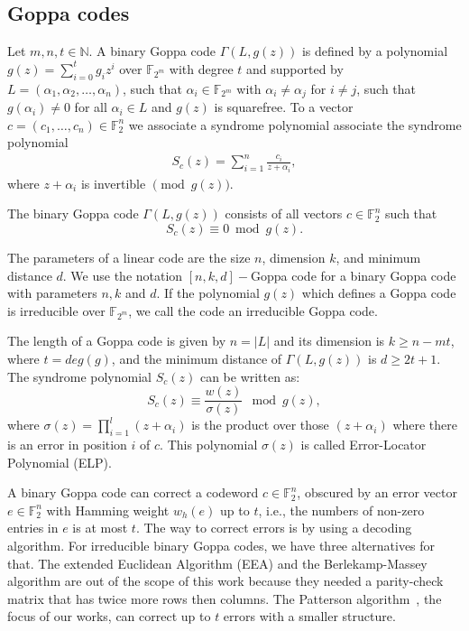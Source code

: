 \subsection{Goppa codes}
Let $m, n, t\in \mathbb{N}$. A binary Goppa code $\Gamma(L, g(z))$ is defined by a polynomial $g(z) = \sum_{i=0}^{t}g_iz^i$ over $\mathbb{F}_{2^m}$ with degree $t$ and supported by $L = (\alpha_1, \alpha_2, \dots, \alpha_n)$, such that $\alpha_i \in \mathbb{F}_{2^m}$ with $\alpha_i \neq \alpha_j$ for $i\neq j$, such that $g(\alpha_i) \neq 0$ for all $\alpha_i \in L$ and $g(z)$ is squarefree. To a vector  $c = (c_1, \ldots, c_{n}) \in \mathbb{F}^n_{2}$ we associate a syndrome polynomial associate the syndrome polynomial
\begin{align}
  S_c(z) = \sum_{i=1}^{n} \frac{c_i}{z+\alpha_i},  
\end{align}
where ${z+\alpha_i}$ is invertible $\pmod{g(z)}$.
\begin{definition}
The binary Goppa code $\Gamma(L, g(z))$ consists of all vectors $c \in \mathbb{F}_{2}^n$ such that
\begin{equation}
    S_c(z) \equiv 0 \bmod{g(z)}.
\end{equation}
\end{definition}

The parameters of a linear code are the size $n$, dimension $k$, and minimum distance $d$. We use the notation $[n,k,d]-$Goppa code for a binary Goppa code with parameters $n,k$ and $d$. If the polynomial $g(z)$ which defines a Goppa code is irreducible over $\mathbb{F}_{2^m}$, we call the code an irreducible Goppa code.

The length of a Goppa code is given by $n = |L|$ and its dimension is $k \geq n-mt$, where $t = deg(g)$, and the minimum distance of $\Gamma(L, g(z))$ is $d \geq 2t + 1$. The syndrome polynomial $S_c(z)$ can be written as:
\begin{equation}
    S_c(z) \equiv \frac{w(z)}{\sigma(z)} \mod g(z),
\end{equation}
where $\sigma(z) = {\displaystyle \prod_{i=1}^{l}(z+\alpha_i)}$ is the product over those $(z+\alpha_i)$ where there is an error in position $i$ of $c$. This polynomial $\sigma(z)$ is called Error-Locator Polynomial (ELP).

A binary Goppa code can correct a codeword $c \in \mathbb{F}_{2}^n$, obscured by an error vector $e \in \mathbb{F}_{2}^n$ with Hamming weight $w_h(e)$ up to $t$, i.e., the numbers of non-zero entries in $e$ is at most $t$. The way to correct errors is by using a decoding algorithm. For irreducible binary Goppa codes, we have three alternatives for that. The extended Euclidean Algorithm (EEA) and the Berlekamp-Massey algorithm are out of the scope of this work because they needed a parity-check matrix that has twice more rows then columns. The Patterson algorithm~\cite{patterson1975algebraic}, the focus of our works, can correct up to $t$ errors with a smaller structure.

